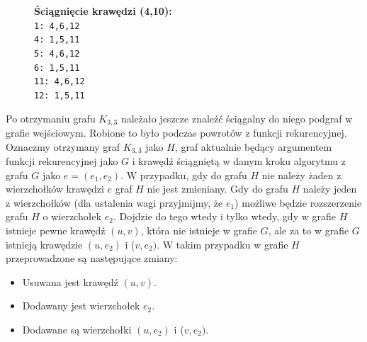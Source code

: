 \documentclass[a4 122pt]{article}
\begin{document}
\begin{figure}[H]
\centering
{}
\caption*
{\textbf{Ściągnięcie krawędzi (4,10):}\\
\texttt
{1: 4,6,12\\
4: 1,5,11\\
5: 4,6,12\\
6: 1,5,11\\
11: 4,6,12\\
12: 1,5,11}}
\end{figure} 


Po otrzymaniu grafu $K_{3,3}$ należało jeszcze znaleźć ściągalny do niego podgraf w grafie wejściowym. Robione to było podczas powrotów z funkcji rekurencyjnej. Oznaczmy otrzymany graf $K_{3,3}$ jako $H$, graf 
aktualnie będący argumentem funkcji rekurencyjnej jako $G$  i krawędź ściągniętą w danym kroku algorytmu z grafu $G$ jako $e = (e_1, e_2)$. 
W przypadku, gdy do grafu $H$ nie należy żaden z wierzchołków krawędzi $e$ graf $H$ nie jest zmieniany.
Gdy do grafu $H$ należy jeden z wierzchołków (dla ustalenia wagi przyjmijmy, że $e_1$) możliwe będzie rozszerzenie grafu $H$ o wierzchołek $e_2$. Dojdzie do tego wtedy i tylko wtedy, gdy w grafie $H$ istnieje pewne krawędź 
$(u,v)$, która nie istnieje w grafie $G$, ale za to w grafie $G$ istnieją krawędzie $(u,e_2)$ i ($v,e_2)$.  W takim przypadku w grafie $H$ przeprowadzone są następujące zmiany:
\begin{itemize}
\item Usuwana jest krawędź $(u,v)$.
\item Dodawany jest wierzchołek $e_2$.
\item Dodawane są wierzchołki $(u,e_2)$ i ($v,e_2)$.
\end{itemize} 
\end{document}
